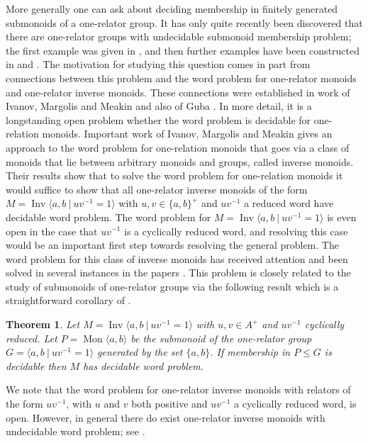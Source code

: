 \documentclass[11pt]{amsart}
\newcommand{\Mgen}[1]{\operatorname{Mon}\bigl\langle #1 \bigr\rangle}
\newcommand{\Gpres}[2]{\bigl\langle #1\:|\:#2 \bigr\rangle}
\newcommand{\Ipres}[2]{\operatorname{Inv}\bigl\langle #1\:|\:#2 \bigr\rangle}
\theoremstyle{plain}
\newtheorem{theorem}{Theorem}[section]
\theoremstyle{definition}
\begin{document}
More generally one can ask about deciding membership in  finitely generated submonoids of a one-relator group. It has only quite recently been discovered that there are one-relator groups with undecidable submonoid membership problem; the first example was given in \cite{gray2020undecidability}, and then further examples have been constructed in \cite{nyberg2022diophantine} and \cite{Foniqi_Gray_Nyberg-Brodda_2025}. The motivation for studying this question comes in part from connections between this problem and the word problem for one-relator monoids and one-relator inverse monoids. These connections were established in work of Ivanov, Margolis and Meakin \cite{ivanov2001one} and also of Guba \cite{guba1997relationship}. In more detail, it is a longstanding open problem whether the word problem is decidable for one-relation monoids. Important work of Ivanov, Margolis and Meakin \cite{ivanov2001one} gives an approach to the word problem for one-relation monoids that goes via a class of monoids that lie between arbitrary monoids and groups, called inverse monoids. Their results show that to solve the word problem for one-relation monoids it would suffice to show that all one-relator inverse monoids of the form $M = \Ipres{a,b}{uv^{-1}=1} $ with $u, v \in \{a,b\}^+$ and $uv^{-1}$ a reduced word have decidable word problem. The word problem for $M = \Ipres{a,b}{uv^{-1}=1} $ is even open in the case that $uv^{-1}$ is a cyclically reduced word, and resolving this case would be an important first step towards resolving the general problem. The word problem for this class of inverse monoids has received attention and been solved in several instances in the papers \cite{dolinka2021new,
inam2025word,
margolis2005distortion}. This problem is closely related to the study of submonoids of one-relator groups via the following result which is a straightforward corollary of 
\cite[Theorem~3.1]{ivanov2001one}. 
\begin{theorem}
\cite[Theorem~3.1]{ivanov2001one}\label{AdianPositiveSubmonoid}
Let $M = \Ipres{a,b}{uv^{-1}=1}$ with $u, v \in A^+$ and $uv^{-1}$ cyclically reduced. Let $P = \Mgen{a,b}$ be the  submonoid of the one-relator group $G=\Gpres{a,b}{uv^{-1}=1}$ generated by the set $\{a,b\}$. If membership in $P \leq G$ is decidable then $M$ has decidable word problem. \end{theorem} 


We note that  the word problem for one-relator inverse monoids with relators of the form $uv^{-1}$, with $u$ and $v$ both positive and $uv^{-1}$ a cyclically reduced word, is open. However, in general there do exist one-relator inverse monoids with undecidable word problem; see \cite{gray2020undecidability}.  
\end{document}
